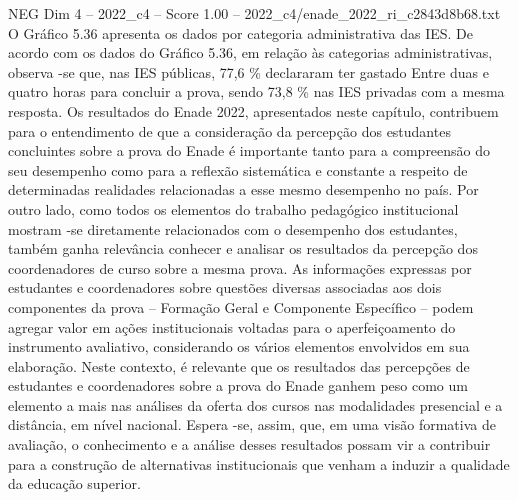 \begin{textsample}{NEG Dim 4 – 2022\_c4 – Score 1.00 – 2022\_c4/enade\_2022\_ri\_c2843d8b68.txt}
O Gráfico 5.36 apresenta os dados por categoria administrativa das IES.
De acordo com os dados do Gráfico 5.36, em relação às categorias administrativas, observa -se que, nas IES públicas, 77,6 \% declararam ter gastado Entre duas e quatro horas para concluir a prova, sendo 73,8 \% nas IES privadas com a mesma resposta.
Os resultados do Enade 2022, apresentados neste capítulo, contribuem para o entendimento de que a consideração da percepção dos estudantes concluintes sobre a prova do Enade é importante tanto para a compreensão do seu desempenho como para a reflexão sistemática e constante a respeito de determinadas realidades relacionadas a esse mesmo desempenho no país.
Por outro lado, como todos os elementos do trabalho pedagógico institucional mostram -se diretamente relacionados com o desempenho dos estudantes, também ganha relevância conhecer e analisar os resultados da percepção dos coordenadores de curso sobre a mesma prova.
As informações expressas por estudantes e coordenadores sobre questões diversas associadas aos dois componentes da prova – Formação Geral e Componente Específico – podem agregar valor em ações institucionais voltadas para o aperfeiçoamento do instrumento avaliativo, considerando os vários elementos envolvidos em sua elaboração.
Neste contexto, é relevante que os resultados das percepções de estudantes e coordenadores sobre a prova do Enade ganhem peso como um elemento a mais nas análises da oferta dos cursos nas modalidades presencial e a distância, em nível nacional.
Espera -se, assim, que, em uma visão formativa de avaliação, o conhecimento e a análise desses resultados possam vir a contribuir para a construção de alternativas institucionais que venham a induzir a qualidade da educação superior.

\end{textsample}
